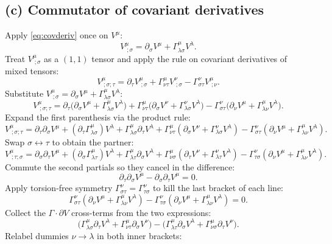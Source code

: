 \documentclass[11pt]{article}
\begin{document}
\subsection*{(c) Commutator of covariant derivatives}

Apply \eqref{eq:covderiv} once on $V^\mu$:
\[ V^\mu_{\;;\sigma} = \partial_\sigma V^\mu + \Gamma^\mu_{\lambda\sigma} V^\lambda. \]
Treat $V^\mu_{\;;\sigma}$ as a $(1,1)$ tensor and apply the rule on covariant derivatives of mixed tensors:
\[ V^\mu_{\;;\sigma;\tau} = \partial_\tau V^\mu_{\;;\sigma} + \Gamma^\mu_{\nu\tau} V^\nu_{\;;\sigma} - \Gamma^\nu_{\sigma\tau} V^\mu_{\;;\nu}. \]
Substitute $V^\mu_{\;;\sigma} = \partial_\sigma V^\mu + \Gamma^\mu_{\lambda\sigma}V^\lambda$:
\[ V^\mu_{\;;\sigma;\tau} = \partial_\tau\bigl(\partial_\sigma V^\mu + \Gamma^\mu_{\lambda\sigma}V^\lambda\bigr) + \Gamma^\mu_{\nu\tau}\bigl(\partial_\sigma V^\nu + \Gamma^\nu_{\lambda\sigma}V^\lambda\bigr) - \Gamma^\nu_{\sigma\tau}\bigl(\partial_\nu V^\mu + \Gamma^\mu_{\lambda\nu}V^\lambda\bigr). \]
Expand the first parenthesis via the product rule:
\[ V^\mu_{\;;\sigma;\tau} = \partial_\tau\partial_\sigma V^\mu + (\partial_\tau \Gamma^\mu_{\lambda\sigma}) V^\lambda + \Gamma^\mu_{\lambda\sigma}\partial_\tau V^\lambda + \Gamma^\mu_{\nu\tau}(\partial_\sigma V^\nu + \Gamma^\nu_{\lambda\sigma} V^\lambda) - \Gamma^\nu_{\sigma\tau}(\partial_\nu V^\mu + \Gamma^\mu_{\lambda\nu}V^\lambda). \]
Swap $\sigma \leftrightarrow \tau$ to obtain the partner:
\[ V^\mu_{\;;\tau;\sigma} = \partial_\sigma\partial_\tau V^\mu + (\partial_\sigma \Gamma^\mu_{\lambda\tau}) V^\lambda + \Gamma^\mu_{\lambda\tau}\partial_\sigma V^\lambda + \Gamma^\mu_{\nu\sigma}(\partial_\tau V^\nu + \Gamma^\nu_{\lambda\tau} V^\lambda) - \Gamma^\nu_{\tau\sigma}(\partial_\nu V^\mu + \Gamma^\mu_{\lambda\nu}V^\lambda). \]
Commute the second partials so they cancel in the difference:
\[ \partial_\tau\partial_\sigma V^\mu - \partial_\sigma\partial_\tau V^\mu = 0. \]
Apply torsion-free symmetry $\Gamma^\nu_{\sigma\tau}=\Gamma^\nu_{\tau\sigma}$ to kill the last bracket of each line:
\[ \Gamma^\nu_{\sigma\tau}(\partial_\nu V^\mu+\Gamma^\mu_{\lambda\nu}V^\lambda) - \Gamma^\nu_{\tau\sigma}(\partial_\nu V^\mu+\Gamma^\mu_{\lambda\nu}V^\lambda) = 0. \]
Collect the $\Gamma\cdot\partial V$ cross-terms from the two expressions:
\[ \bigl(\Gamma^\mu_{\lambda\sigma}\partial_\tau V^\lambda + \Gamma^\mu_{\nu\tau}\partial_\sigma V^\nu\bigr) - \bigl(\Gamma^\mu_{\lambda\tau}\partial_\sigma V^\lambda + \Gamma^\mu_{\nu\sigma}\partial_\tau V^\nu\bigr). \]
Relabel dummies $\nu\to\lambda$ in both inner brackets:
\end{document}
